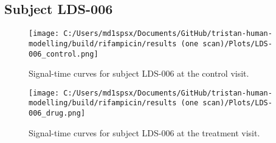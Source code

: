 \documentclass{epflreport}%
\begin{document}
\subsection{Subject LDS{-}006}%
\label{subsec:SubjectLDS{-}006}%

%


\begin{figure}[h!]%
\centering%
\texttt{[image: C:/Users/md1spsx/Documents/GitHub/tristan-human-modelling/build/rifampicin/results (one scan)/Plots/LDS-006\_control.png]}%
\caption{Signal{-}time curves for subject LDS{-}006 at the control visit.}%
\end{figure}

%


\begin{figure}[h!]%
\centering%
\texttt{[image: C:/Users/md1spsx/Documents/GitHub/tristan-human-modelling/build/rifampicin/results (one scan)/Plots/LDS-006\_drug.png]}%
\caption{Signal{-}time curves for subject LDS{-}006 at the treatment visit.}%
\end{figure}
\end{document}

